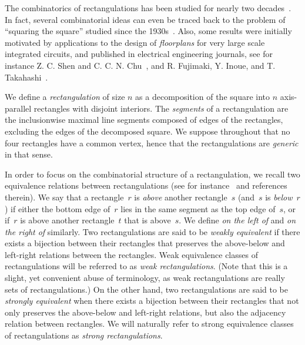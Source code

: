 \documentclass{amsart}
\theoremstyle{definition}
\newcommand{\darkblue}{\color{darkblue}} %
\newcommand{\defn}[1]{\textsl{\darkblue #1}} %
\begin{document}
The combinatorics of rectangulations has been studied for nearly two decades~\cite{MR2233287,MR2763051,MR2871762,MR2864445,MR3084577,MR3192492,MR3878132,MR4598046,AB24,ACFF24}.
In fact, several combinatorial ideas can even be traced back to the problem of ``squaring the square'' studied since the 1930s~\cite{A30,Abe32,MR0000470,MR0003040}. Also, some results were initially motivated by applications to the design of \defn{floorplans} for very large scale integrated circuits, and published in electrical engineering journals, see for instance Z. C. Shen and C. C. N. Chu~\cite{SC03}, and R. Fujimaki, Y. Inoue, and T. Takahashi~\cite{FT07,TF08,ITF09,FIT09}.

We define a \defn{rectangulation} of size $n$ as a decomposition of the square into $n$ axis-parallel rectangles with disjoint interiors.
The \defn{segments} of a rectangulation are the inclusionwise maximal line segments composed of edges of the rectangles, excluding the edges of the decomposed square.
We suppose throughout that no four rectangles have a common vertex, hence that the rectangulations are \defn{generic} in that sense.

In order to focus on the combinatorial structure of a rectangulation, we recall two equivalence relations between rectangulations (see for instance~\cite{ACFF24} and references therein).
We say that a rectangle~$r$ is \defn{above} another rectangle~$s$ (and~$s$ is \defn{below}~$r$) if either the bottom edge of~$r$ lies in the same segment as the top edge of~$s$, or if~$r$ is above another rectangle~$t$ that is above~$s$.
We define \defn{on the left of} and \defn{on the right of} similarly.
Two rectangulations are said to be \defn{weakly equivalent} if there exists a bijection between their rectangles that preserves the above-below and left-right relations between the rectangles.
Weak equivalence classes of rectangulations will be referred to as \defn{weak rectangulations}.
(Note that this is a slight, yet convenient abuse of terminology, as weak rectangulations are really sets of rectangulations.)
On the other hand, two rectangulations are said to be \defn{strongly equivalent} when there exists a bijection between their rectangles that not only preserves the above-below and left-right relations, but also the adjacency relation between rectangles.
We will naturally refer to strong equivalence classes of rectangulations as \defn{strong rectangulations}.
\end{document}
